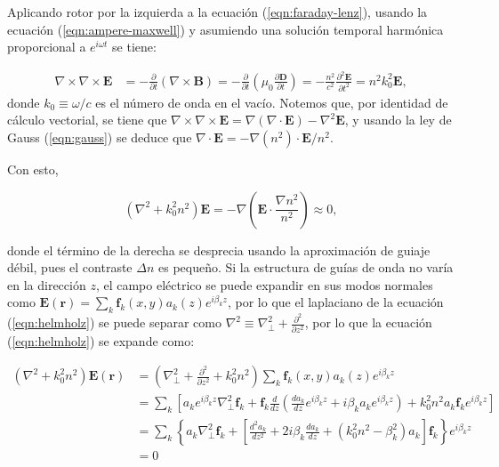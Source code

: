 \documentclass[12pt, letterpaper]{article}
\begin{document}
Aplicando rotor por la izquierda a la ecuación (\ref{eqn:faraday-lenz}), usando la ecuación (\ref{eqn:ampere-maxwell}) y asumiendo una solución temporal harmónica proporcional a $e^{i\omega t}$ se tiene:

\begin{align}
	\nabla\times\nabla\times\textbf{E} &= -\frac{\partial}{\partial t}(\nabla\times\textbf{B}) = -\frac{\partial}{\partial t}\left(\mu_0\frac{\partial \textbf{D}}{\partial t}\right) = -\frac{n^2}{c^2}\frac{\partial^2 \textbf{E}}{\partial t^2} = n^2k_0^2 \textbf{E}, \label{eqn:rotordoble}
\end{align}
donde $k_0 \equiv \omega/c$ es el número de onda en el vacío. Notemos que, por identidad de cálculo vectorial, se tiene que $\nabla\times\nabla\times\textbf{E} = \nabla(\nabla\cdot\textbf{E}) - \nabla^2\textbf{E}$, y usando la ley de Gauss (\ref{eqn:gauss}) se deduce que $\nabla\cdot \textbf{E} = -\nabla(n^2)\cdot\textbf{E}/n^2$.

Con esto, 

\begin{equation}
	(\nabla^2  + k_0^2n^2)\textbf{E} = -\nabla\left(\textbf{E} \cdot \frac{\nabla n^2}{n^2}\right) \approx 0, \label{eqn:helmholz}
\end{equation}

donde el término de la derecha se desprecia usando la aproximación de guiaje débil, pues el contraste $\Delta n$ es pequeño. Si la estructura de guías de onda no varía en la dirección $z$, el campo eléctrico se puede expandir en sus modos normales como $\textbf{E}(\textbf{r}) = \sum_k \textbf{f}_k(x, y) a_k(z) e^{i\beta_k z}$, por lo que el laplaciano de la ecuación (\ref{eqn:helmholz}) se puede separar como $\nabla^2 \equiv \nabla_\perp^2 + \frac{\partial^2}{\partial z^2}$, por lo que la ecuación (\ref{eqn:helmholz}) se expande como:

\begin{align}
	(\nabla^2  + k_0^2n^2) \textbf{E}(\textbf{r}) &= \left(\nabla_\perp^2 + \frac{\partial^2}{\partial z^2} + k_0^2n^2\right)\sum_k \textbf{f}_k(x, y) a_k(z) e^{i\beta_k z} 
\\	
	&= \sum_k \left[ a_ke^{i\beta_k z} \nabla_\perp^2 \textbf{f}_k + \textbf{f}_k\frac{d}{dz}\left( \frac{da_k}{dz}e^{i\beta_k z}  + i\beta_k a_ke^{i\beta_k z}\right) + k_0^2n^2 a_k\textbf{f}_k  e^{i\beta_k z}\right]
	\\
	&=
	\sum_k \left\{ a_k \nabla_\perp^2 \textbf{f}_k + \left[\frac{d^2 a_k}{dz^2} + 2i\beta_k \frac{d a_k}{dz} + \left(k_0^2n^2  - \beta_k^2\right) a_k \right]\textbf{f}_k \right\}e^{i\beta_k z}
	\\
	&=
	0
\end{align}
\end{document}
